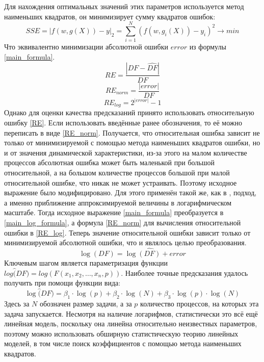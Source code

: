 		Для нахождения оптимальных значений этих параметров используется метод наименьших квадратов, он минимизирует сумму квадратов ошибок:
		\[SSE = |f(w, g(X)) - y|_2 = \sum_{i = 1}^{N}{(f(w, g_i(X)) - y_i)^2 \rightarrow min}\]
		Что эквивалентно минимизации абсолютной ошибки \(error\) из формулы \eqref{main_formula}.
		\begin{equation}
			\label{RE} 
			RE = \frac{|DF - \hat{DF}|}{DF}
		\end{equation}
		\begin{equation}
			\label{RE_norm}
			RE_{norm} = \frac{|error|}{DF}
		\end{equation}
		\begin{equation}
			\label{RE_log}
			RE_{log}= 2^{|error|} - 1
		\end{equation}
		Однако для оценки качества предсказаний принято использовать относительную ошибку \eqref{RE}. Если использовать введённые ранее обозначения, то её можно переписать в виде \eqref{RE_norm}. Получается, что относительная ошибка зависит не только от минимизируемой с помощью метода наименьших квадратов ошибки, но и от значения динамической характеристики, из-за этого на малом количестве процессов абсолютная ошибка может быть маленькой при большой относительной, а на большом количестве процессов большой при малой относительной ошибке, что никак не может устраивать. Поэтому исходное выражение было модифицировано. Для этого применён такой же, как в \cite{log_main}, подход, а именно приближение аппроксимируемой величины в логарифмическом масштабе. Тогда исходное выражение \eqref{main_formula} преобразуется в \eqref{main_log_formula}, а формула \eqref{RE_norm} для вычисления относительной ошибки в \eqref{RE_log}. Теперь значение относительной ошибки зависит только от минимизируемой абсолютной ошибки, что и являлось целью преобразования.
		\begin{equation}\label{main_log_formula}
		\log{(DF)} = \log{\hat{(DF)}} + error
		\end{equation}
		Ключевым шагом является параметризация функции \(log{\hat(DF)} = log(F(x_1, x_2, \ldots, x_n, p))\). Наиболее точные предсказания удалось получить при помощи функции вида:
		\begin{equation}
		\log{\hat(DF)} = \beta_{1} \cdot \log{(p)} + \beta_{2} \cdot \log{(N)} + \beta_{3} \cdot \log{(p)} \cdot \log{(N)}
		\end{equation}
		Здесь за \(N\) обозначен размер задачи, а за \(p\) количество процессов, на которых эта задача запускается. Несмотря на наличие логарифмов, статистически это всё ещё линейная модель, поскольку она линейна относительно неизвестных параметров, поэтому можно использовать обширную статистическую теорию линейных моделей, в том числе поиск коэффициентов с помощью метода наименьших квадратов.


